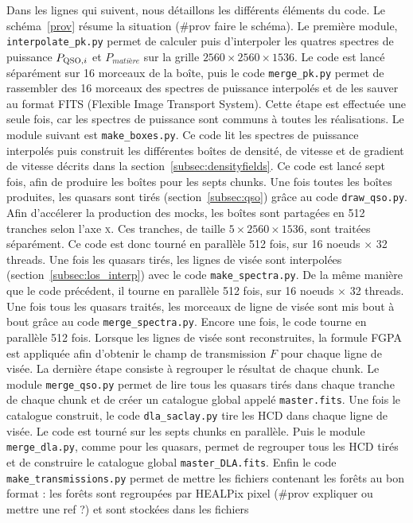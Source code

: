 \documentclass[11pt, twoside, a4paper, openright]{report}
\begin{document}
Dans les lignes qui suivent, nous détaillons les différents éléments du code.
Le schéma~\ref{prov} résume la situation (\#prov faire le schéma).
Le première module, \texttt{interpolate\_pk.py} permet de calculer puis d'interpoler les quatres spectres de puissance $P_{\textsc{QSO},i}$ et $P_{matière}$ sur la grille $\num{2560}\times\num{2560}\times\num{1536}$. Le code est lancé séparément sur 16 morceaux de la boîte, puis le code \texttt{merge\_pk.py} permet de rassembler des 16 morceaux des spectres de puissance interpolés et de les sauver au format FITS (Flexible Image Transport System). Cette étape est effectuée une seule fois, car les spectres de puissance sont communs à toutes les réalisations. Le module suivant est \texttt{make\_boxes.py}. Ce code lit les spectres de puissance interpolés puis construit les différentes boîtes de densité, de vitesse et de gradient de vitesse décrits dans la section~\ref{subsec:densityfields}. Ce code est lancé sept fois, afin de produire les boîtes pour les septs chunks. Une fois toutes les boîtes produites, les quasars sont tirés (section~\ref{subsec:qso}) grâce au code \texttt{draw\_qso.py}. Afin d'accélerer la production des mocks, les boîtes sont partagées en \num{512} tranches selon l'axe \textsc{x}. Ces tranches, de taille $\num{5}\times\num{2560}\times\num{1536}$, sont traitées séparément. Ce code est donc tourné en parallèle \num{512} fois, sur 16 noeuds $\times$ 32 threads. Une fois les quasars tirés, les lignes de visée sont interpolées (section~\ref{subsec:los_interp}) avec le code \texttt{make\_spectra.py}. De la même manière que le code précédent, il tourne en parallèle \num{512} fois, sur 16 noeuds $\times$ 32 threads. Une fois tous les quasars traités, les morceaux de ligne de visée sont mis bout à bout grâce au code \texttt{merge\_spectra.py}. Encore une fois, le code tourne en parallèle \num{512} fois. Lorsque les lignes de visée sont reconstruites, la formule FGPA est appliquée afin d'obtenir le champ de transmission $F$ pour chaque ligne de visée.
La dernière étape consiste à regrouper le résultat de chaque chunk. Le module \texttt{merge\_qso.py} permet de lire tous les quasars tirés dans chaque tranche de chaque chunk et de créer un catalogue global appelé \texttt{master.fits}. Une fois le catalogue construit, le code \texttt{dla\_saclay.py} tire les HCD dans chaque ligne de visée. Le code est tourné sur les septs chunks en parallèle. Puis le module \texttt{merge\_dla.py}, comme pour les quasars, permet de regrouper tous les HCD tirés et de construire le catalogue global \texttt{master\_DLA.fits}. Enfin le code \texttt{make\_transmissions.py} permet de mettre les fichiers contenant les forêts au bon format : les forêts sont regroupées par HEALPix pixel (\#prov expliquer ou mettre une ref ?) et sont stockées dans les fichiers
\end{document}
